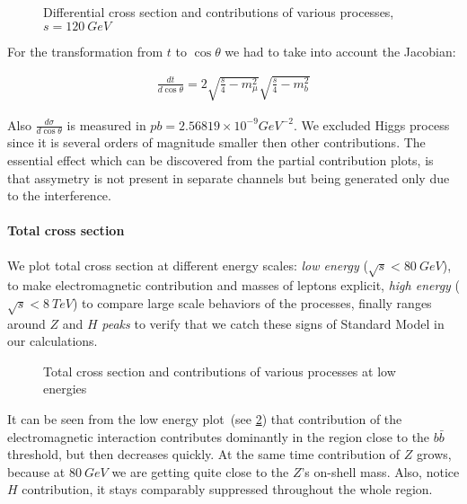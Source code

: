 \documentclass{article}
\newcommand{\scatteringoutput}{../scattering/output}
\begin{document}
\begin{figure}[H]
    \centering
    \hfill%
    \caption{Differential cross section and contributions of various processes, $s = 120~GeV$}%
    \label{fig:dcrsc}
\end{figure}

For the transformation from $t$ to $\cos{\theta}$ we had to take into account the Jacobian:

\begin{align}
    \frac{d t}{d \cos{\theta}} = 2 \sqrt{\frac{s}{4} - m_\mu^2} \sqrt{\frac{s}{4} - m_b^2}
\end{align}

Also $\frac{d \sigma}{d \cos{\theta}}$ is measured in $pb = 2.56819\times10^{-9} GeV^{-2}$. We excluded Higgs process since it is several orders of magnitude smaller then other contributions. The essential effect which can be discovered from the partial contribution plots, is that assymetry is not present in separate channels but being generated only due to the interference.

\paragraph{Total cross section} We plot total cross section at different energy scales: \textit{low energy} ($\sqrt{s}<80~GeV$), to make electromagnetic contribution and masses of leptons explicit, \textit{high energy} ($\sqrt{s}<8~TeV$) to compare large scale behaviors of the processes, finally ranges around $Z$ and $H$ \textit{peaks} to verify that we catch these signs of Standard Model in our calculations.

\begin{figure}[H]
    \centering
    \hfill%
    \caption{Total cross section and contributions of various processes at low energies}%
    \label{fig:totcrsc_lowS}
\end{figure}

It can be seen from the low energy plot~(see \cref{fig:totcrsc_lowS}) that contribution of the electromagnetic interaction contributes dominantly in the region close to the $b \bar{b}$ threshold, but then decreases quickly. At the same time contribution of $Z$ grows, because at $80~GeV$ we are getting quite close to the $Z$'s on-shell mass. Also, notice $H$ contribution, it stays comparably suppressed throughout the whole region.
\end{document}
